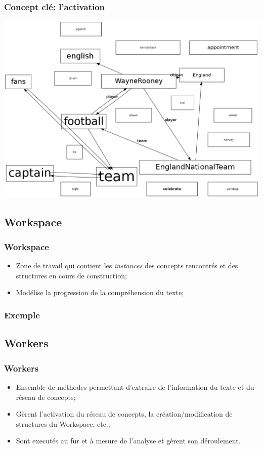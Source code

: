 \documentclass{beamer}
\begin{document}
        \begin{frame}
        \frametitle{Concept clé: l'activation}
            \includegraphics[height=0.8\textheight]{RC/figures/RCetape30.png}
        \end{frame}

    \subsection{Workspace}
        \begin{frame}
        \frametitle{Workspace}
            \begin{itemize}
                \item Zone de travail qui contient les \textit{instances} des concepts rencontrés et des structures en cours de construction;
                \item Modélise la progression de la compréhension du texte;
            \end{itemize}
        \end{frame}

        \begin{frame}
        \frametitle{Exemple}
        \end{frame}

    \subsection{Workers}
        \begin{frame}
        \frametitle{Workers}
            \begin{itemize}
                \item Ensemble de méthodes permettant d'extraire de l'information du texte et du réseau de concepts;
                \item Gèrent l'activation du réseau de concepts, la création/modification de structures du Workspace, etc.;
                \item Sont executés au fur et à mesure de l'analyse et gèrent son déroulement.
            \end{itemize}
        \end{frame}
\end{document}
